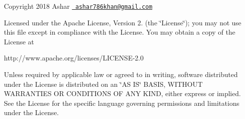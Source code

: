 Copyright 2018 Ashar 
\href{mailto:ashar786khan@gmail.com}{\texttt{ ashar786khan@gmail.\+com}}

Licensed under the Apache License, Version 2. (the \char`\"{}\+License\char`\"{}); you may not use this file except in compliance with the License. You may obtain a copy of the License at \begin{DoxyVerb}http://www.apache.org/licenses/LICENSE-2.0
\end{DoxyVerb}


Unless required by applicable law or agreed to in writing, software distributed under the License is distributed on an \char`\"{}\+A\+S I\+S\char`\"{} B\+A\+S\+IS, W\+I\+T\+H\+O\+UT W\+A\+R\+R\+A\+N\+T\+I\+ES OR C\+O\+N\+D\+I\+T\+I\+O\+NS OF A\+NY K\+I\+ND, either express or implied. See the License for the specific language governing permissions and limitations under the License. 